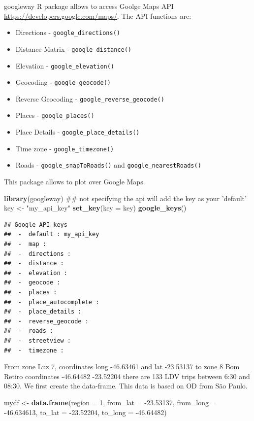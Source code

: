 \documentclass[12pt,graybox,envcountchap,sectrefs]{krantz}
\makeatletter
\newenvironment{Shaded}{\begin{snugshade}}{\end{snugshade}}
\newcommand{\KeywordTok}[1]{\textcolor[rgb]{0.13,0.29,0.53}{\textbf{#1}}}
\newcommand{\DataTypeTok}[1]{\textcolor[rgb]{0.13,0.29,0.53}{#1}}
\newcommand{\DecValTok}[1]{\textcolor[rgb]{0.00,0.00,0.81}{#1}}
\newcommand{\FloatTok}[1]{\textcolor[rgb]{0.00,0.00,0.81}{#1}}
\newcommand{\StringTok}[1]{\textcolor[rgb]{0.31,0.60,0.02}{#1}}
\newcommand{\NormalTok}[1]{#1}
\providecommand{\tightlist}{%
  \setlength{\itemsep}{0pt}\setlength{\parskip}{0pt}}
\newenvironment{kframe}{%
\medskip{}
\setlength{\fboxsep}{.8em}
 \def\at@end@of@kframe{}%
 \ifinner\ifhmode%
  \def\at@end@of@kframe{\end{minipage}}%
  \begin{minipage}{\columnwidth}%
 \fi\fi%
 \def\FrameCommand##1{\hskip\@totalleftmargin \hskip-\fboxsep
 \colorbox{shadecolor}{##1}\hskip-\fboxsep
     \hskip-\linewidth \hskip-\@totalleftmargin \hskip\columnwidth}%
 \MakeFramed {\advance\hsize-\width
   \@totalleftmargin\z@ \linewidth\hsize
   \@setminipage}}%
 {\par\unskip\endMakeFramed%
 \at@end@of@kframe}
\renewenvironment{Shaded}{\begin{kframe}}{\end{kframe}}
\theoremstyle{definition}
\theoremstyle{definition}
\theoremstyle{definition}
\theoremstyle{remark}
\makeatother
\begin{document}
googleway \citep{googleway} R package allows to access Goolge Maps API
\url{https://developers.google.com/maps/}. The API functions are:

\begin{itemize}
\tightlist
\item
  Directions - \texttt{google\_directions()}
\item
  Distance Matrix - \texttt{google\_distance()}
\item
  Elevation - \texttt{google\_elevation()}
\item
  Geocoding - \texttt{google\_geocode()}
\item
  Reverse Geocoding - \texttt{google\_reverse\_geocode()}
\item
  Places - \texttt{google\_places()}
\item
  Place Details - \texttt{google\_place\_details()}
\item
  Time zone - \texttt{google\_timezone()}
\item
  Roads - \texttt{google\_snapToRoads()} and
  \texttt{google\_nearestRoads()}
\end{itemize}

This package allows to plot over Google Maps.

\begin{Shaded}
\begin{Highlighting}[]
\KeywordTok{library}\NormalTok{(googleway)}
\NormalTok{## not specifying the api will add the key as your 'default'}
\NormalTok{key <-}\StringTok{ "my_api_key"}
\KeywordTok{set_key}\NormalTok{(}\DataTypeTok{key =}\NormalTok{ key)}
\KeywordTok{google_keys}\NormalTok{()}
\end{Highlighting}
\end{Shaded}

\begin{verbatim}
## Google API keys
##  -  default : my_api_key 
##  -  map :  
##  -  directions :  
##  -  distance :  
##  -  elevation :  
##  -  geocode :  
##  -  places :  
##  -  place_autocomplete :  
##  -  place_details :  
##  -  reverse_geocode :  
##  -  roads :  
##  -  streetview :  
##  -  timezone :
\end{verbatim}

From zone Luz 7, coordinates long -46.63461 and lat -23.53137 to zone 8
Bom Retiro coordinates -46.64482 -23.52204 there are 133 LDV trips
between 6:30 and 08:30. We first create the data-frame. This data is
based on OD from São Paulo.

\begin{Shaded}
\begin{Highlighting}[]
\NormalTok{mydf <-}\StringTok{ }\KeywordTok{data.frame}\NormalTok{(}\DataTypeTok{region =} \DecValTok{1}\NormalTok{,}
                   \DataTypeTok{from_lat =} \FloatTok{-23.53137}\NormalTok{,}
                   \DataTypeTok{from_long =} \FloatTok{-46.634613}\NormalTok{,}
                   \DataTypeTok{to_lat =} \FloatTok{-23.52204}\NormalTok{,}
                   \DataTypeTok{to_long =} \FloatTok{-46.64482}\NormalTok{)}
\end{Highlighting}
\end{Shaded}
\end{document}
